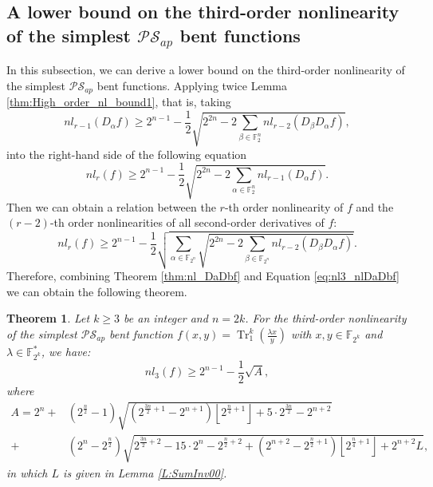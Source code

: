 \documentclass[preprint,10pt]{elsarticle}
\newcommand{\F}{\mathbb{F}}
\newcommand{\0}{\textbf{0}}
\newcommand{\1}{\textbf{1}}
\newcommand{\TRACE}{\operatorname{Tr}_1^k}
\theoremstyle{plain}
\newtheorem{theorem}{Theorem}
\begin{document}
\subsection{A lower bound on the third-order nonlinearity of the simplest $\mathcal{PS}_{ap}$ bent functions}

In this subsection,  we can derive a lower bound on the third-order nonlinearity of the simplest $\mathcal{PS}_{ap}$ bent functions.
Applying twice Lemma \ref{thm:High_order_nl_bound1}, that is, taking
    \[nl_{r-1}(D_{\alpha}f) \ge 2^{n-1}-\frac{1}{2}\sqrt{2^{2n}-2\sum_{\beta\in\F_2^n}nl_{r-2}(D_{\beta}D_{\alpha}f)},\]
    into the right-hand side of the following equation
    \[nl_r(f) \ge 2^{n-1}-\frac{1}{2}\sqrt{2^{2n}-2\sum_{\alpha\in\F_2^n}nl_{r-1}(D_{\alpha}f)}.\]
    Then we can obtain a relation between the $r$-th order nonlinearity of $f$ and the $(r-2)$-th order nonlinearities of all second-order derivatives of $f$:
    \begin{equation}\label{eq:nl3_nlDaDbf}
        nl_r(f)\ge 2^{n-1}-\frac{1}{2}\sqrt{\sum_{\alpha\in\F_{2^n}}\sqrt{2^{2n}-2\sum_{\beta\in\F_{2^n}} nl_{r-2}(D_{\beta}D_{\alpha}f)}}.
    \end{equation}
    Therefore, combining Theorem \ref{thm:nl_DaDbf} and Equation \eqref{eq:nl3_nlDaDbf} we can obtain the following theorem.
    \begin{theorem}\label{th:our_lower_bound}
        Let $k\ge 3$ be an integer and $n=2k$. For the third-order nonlinearity of the simplest $\mathcal{PS}_{ap}$ bent function $f(x,y)=\TRACE(\frac{\lambda x}{y})$ with $x,y\in\F_{2^k}$ and $\lambda\in\F_{2^k}^*$, we have:
        \[nl_3(f)\ge 2^{n-1}-\frac{1}{2}\sqrt{A},\]
        where
        \begin{align*}
            A=2^n+&(2^{\frac{n}{2}}-1)\sqrt{(2^{\frac{3n}{2}+1}-2^{n+1})\left\lfloor 2^{\frac{n}{4}+1}\right\rfloor+5\cdot 2^{\frac{3n}{2}}-2^{n+2}}\\
            +&(2^n-2^{\frac{n}{2}})\sqrt{2^{\frac{3n}{2}+2}-15\cdot 2^n-2^{\frac{n}{2}+2}+(2^{n+2}-2^{\frac{n}{2}+1})\left\lfloor 2^{\frac{n}{4}+1}\right\rfloor+2^{n+2}L},
        \end{align*}
       in which $L$ is given in Lemma \ref{L:SumInv00}.
    \end{theorem}
\end{document}
